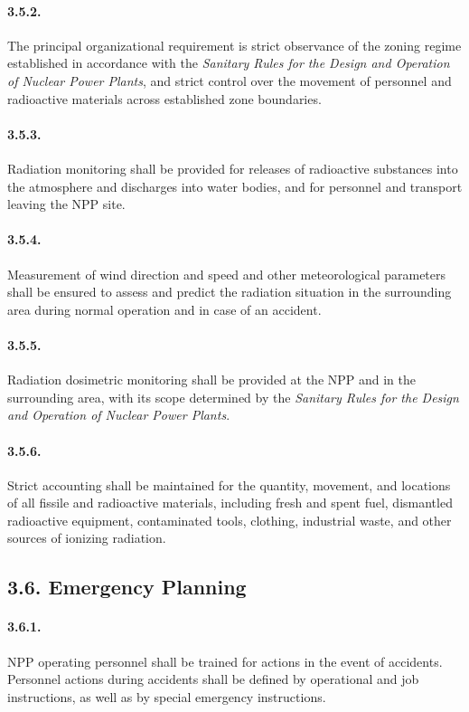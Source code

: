 \documentclass[openright]{bookest}
\begin{document}
\paragraph{3.5.2.}
The principal organizational requirement is strict observance of the zoning regime established in accordance with the \textit{Sanitary Rules for the Design and Operation of Nuclear Power Plants}, and strict control over the movement of personnel and radioactive materials across established zone boundaries.

\paragraph{3.5.3.}
Radiation monitoring shall be provided for releases of radioactive substances into the atmosphere and discharges into water bodies, and for personnel and transport leaving the NPP site.

\paragraph{3.5.4.}
Measurement of wind direction and speed and other meteorological parameters shall be ensured to assess and predict the radiation situation in the surrounding area during normal operation and in case of an accident.

\paragraph{3.5.5.}
Radiation dosimetric monitoring shall be provided at the NPP and in the surrounding area, with its scope determined by the \textit{Sanitary Rules for the Design and Operation of Nuclear Power Plants}.

\paragraph{3.5.6.}
Strict accounting shall be maintained for the quantity, movement, and locations of all fissile and radioactive materials, including fresh and spent fuel, dismantled radioactive equipment, contaminated tools, clothing, industrial waste, and other sources of ionizing radiation.

\subsection*{3.6. Emergency Planning}

\paragraph{3.6.1.}
NPP operating personnel shall be trained for actions in the event of accidents.  
Personnel actions during accidents shall be defined by operational and job instructions, as well as by special emergency instructions.
\end{document}
